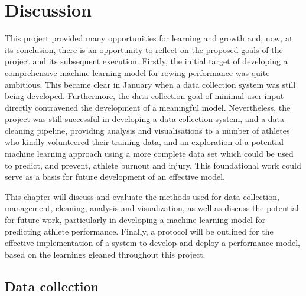 \chapter{\label{chap:discussion}Discussion}
This project provided many opportunities for learning and growth and, now, at its conclusion, there is an opportunity to reflect on the proposed goals of the project and its subsequent execution. Firstly, the initial target of developing a comprehensive machine-learning model for rowing performance was quite ambitious. This became clear in January when a data collection system was still being developed. Furthermore, the data collection goal of minimal user input directly contravened the development of a meaningful model. Nevertheless, the project was still successful in developing a data collection system, and a data cleaning pipeline, providing analysis and visualisations to a number of athletes who kindly volunteered their training data, and an exploration of a potential machine learning approach using a more complete data set which could be used to predict, and prevent, athlete burnout and injury. This foundational work could serve as a basis for future development of an effective model. 

This chapter will discuss and evaluate the methods used for data collection, management, cleaning, analysis and visualization, as well as discuss the potential for future work, particularly in developing a machine-learning model for predicting athlete performance. Finally, a protocol will be outlined for the effective implementation of a system to develop and deploy a performance model, based on the learnings gleaned throughout this project.

\section{Data collection}
